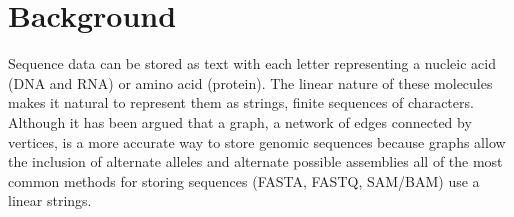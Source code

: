 \documentclass{bmcart}
\begin{document}
\begin{frontmatter}
\begin{abstractbox}

\begin{keyword}
\end{keyword}


\end{abstractbox}
%

\end{frontmatter}



\section*{Background}


Sequence data can be stored as text with each letter representing a nucleic acid (DNA and RNA) or amino acid (protein). The linear nature of these molecules makes it natural to represent them as strings, finite sequences of characters. Although it has been argued that a graph, a network of edges connected by vertices, is a more accurate way to store genomic sequences because graphs allow the inclusion of alternate alleles and alternate possible assemblies \cite{jaffe2012fastg} all of the most common methods for storing sequences (FASTA, FASTQ, SAM/BAM) use a linear strings.
\end{document}
